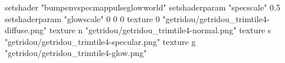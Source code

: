 setshader "bumpenvspecmappulseglowworld"
setshaderparam "specscale" 0.5
setshaderparam "glowscale" 0 0 0
texture 0 "getridou/getridou_trimtile4-diffuse.png"
texture n "getridou/getridou_trimtile4-normal.png"
texture s "getridou/getridou_trimtile4-specular.png"
texture g "getridou/getridou_trimtile4-glow.png"